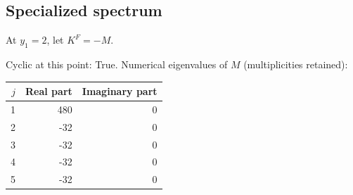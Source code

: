 \documentclass[10pt,a4paper]{article}
\newcommand{\fitmath}[1]{\sbox{\mathbox}{$\displaystyle #1$}\ifdim\wd\mathbox>\linewidth\resizebox{\linewidth}{!}{\usebox{\mathbox}}\else\usebox{\mathbox}\fi}
\begin{document}
\subsection*{Specialized spectrum}
At $y_1=2$, let $K^F=-M$.
\begin{center}\fitmath{\Delta=1}\end{center}
Cyclic at this point: True.
Numerical eigenvalues of $M$ (multiplicities retained):
\begin{center}\small\begin{tabular}{rrr}\toprule $j$ & Real part & Imaginary part\\\midrule
1 & 480 & 0\\
2 & -32 & 0\\
3 & -32 & 0\\
4 & -32 & 0\\
5 & -32 & 0\\
\bottomrule\end{tabular}\end{center}
\end{document}
